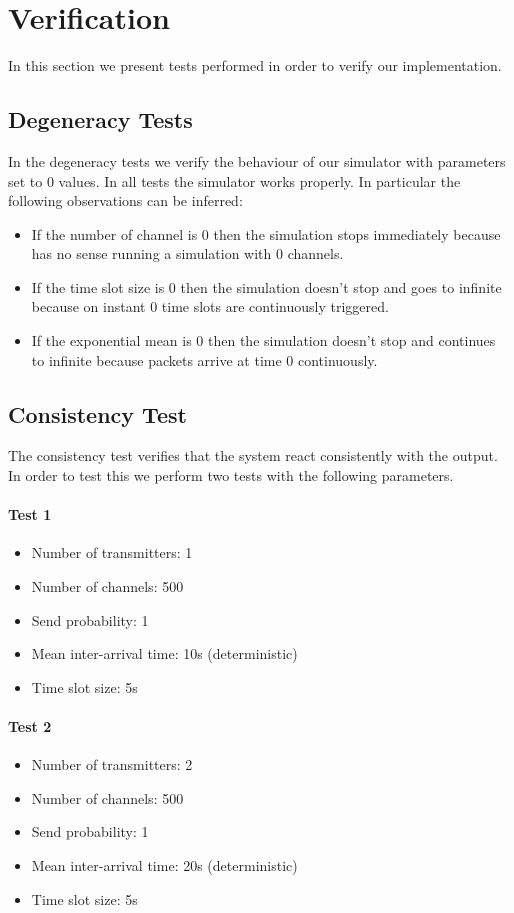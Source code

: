 \section{Verification}
In this section we present tests performed in order to verify our implementation.

\subsection{Degeneracy Tests}
In the degeneracy tests we verify the behaviour of our simulator with parameters set to 0 values. In all tests the simulator works properly. In particular the following observations can be inferred:
\begin{itemize}
	\item If the number of channel is 0 then the simulation stops immediately because has no sense running a simulation with 0 channels.
	\item If the time slot size is 0 then the simulation doesn't stop and goes to infinite because on instant 0  time slots are continuously triggered.
	\item If the exponential mean is 0 then the simulation doesn't stop and continues to infinite because packets arrive at time 0 continuously.
\end{itemize}

\subsection{Consistency Test}
The consistency test verifies that the system react consistently with the output. In order to test this we perform two tests with the following parameters.
\paragraph{Test 1}
\begin{itemize}
	\item Number of transmitters: 1
	\item Number of channels: 500
	\item Send probability: 1
	\item Mean inter-arrival time: 10s (deterministic)
	\item Time slot size: 5s
\end{itemize}

\paragraph{Test 2}
\begin{itemize}
	\item Number of transmitters: 2
	\item Number of channels: 500
	\item Send probability: 1
	\item Mean inter-arrival time: 20s (deterministic)
	\item Time slot size: 5s
\end{itemize}


